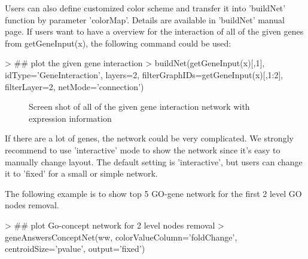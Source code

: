 \documentclass[a4paper]{article}
\begin{document}
Users can also define customized color scheme and transfer it into 'buildNet' function by parameter 'colorMap'. Details are available in 'buildNet' manual page. If users want to have a overview for the interaction of all of the given genes from getGeneInput(x), the following command could be used:
\begin{Schunk}
\begin{Sinput}
> ## plot the given gene interaction
> buildNet(getGeneInput(x)[,1], idType='GeneInteraction', layers=2, filterGraphIDs=getGeneInput(x)[,1:2], filterLayer=2, netMode='connection')
\end{Sinput}
\end{Schunk}
\begin{figure}
\centering
\centering
{}
\caption{Screen shot of all of the given gene interaction network with expression information}
\label{geneInteractionNetwork}
\end{figure}


If there are a lot of genes, the network could be very complicated. We strongly recommend to use 'interactive' mode to show the network since it's easy to manually change layout. The default setting is 'interactive', but users can change it to 'fixed' for a small or simple network.


The following example is to show top 5 GO-gene network for the first 2 level GO nodes removal.
\begin{Schunk}
\begin{Sinput}
> ## plot Go-concept network for 2 level nodes removal
> geneAnswersConceptNet(ww, colorValueColumn='foldChange', centroidSize='pvalue', output='fixed')
\end{Sinput}
\end{Schunk}
\end{document}
